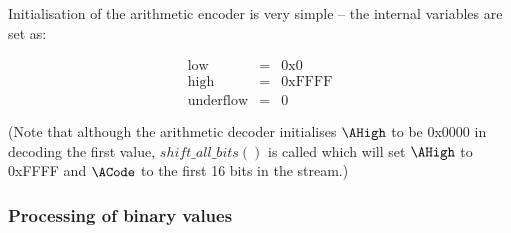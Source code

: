 Initialisation of the arithmetic encoder is very simple -- the internal variables are
set as:

\begin{eqnarray*}
\text{low}&=&\text{0x0} \\
\text{high}&=&\text{0xFFFF} \\
\text{underflow}&=&0
\end{eqnarray*}

(Note that although the arithmetic decoder initialises $\AHigh$ to be 0x0000 in decoding the first
value, $shift\_all\_bits()$ is called which will set $\AHigh$ to 0xFFFF and $\ACode$ to the first
16 bits in the stream.)

\subsubsection{Processing of binary values}
